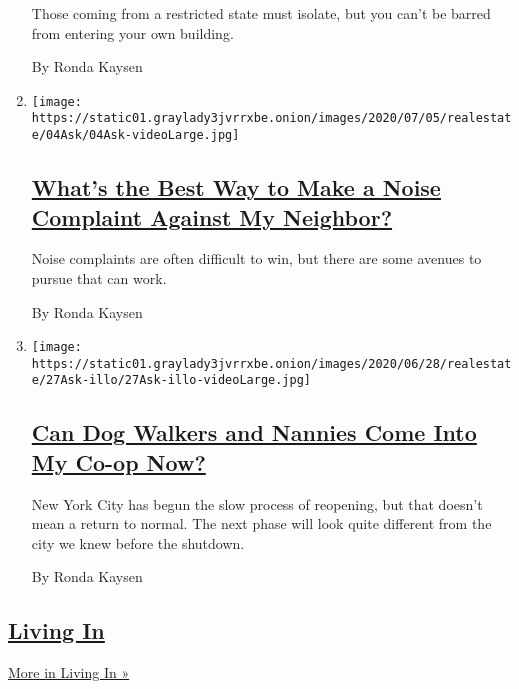 \begin{enumerate}
  Those coming from a restricted state must isolate, but you can't be
  barred from entering your own building.

  By Ronda Kaysen
\item
  \texttt{[image: https://static01.graylady3jvrrxbe.onion/images/2020/07/05/realestate/04Ask/04Ask-videoLarge.jpg]}

  \hypertarget{whats-the-best-way-to-make-a-noise-complaint-against-my-neighbor}{%
  \subsection{\texorpdfstring{\href{/2020/07/04/realestate/whats-the-best-way-to-make-a-noise-complaint-against-my-neighbor.html}{What's
  the Best Way to Make a Noise Complaint Against My
  Neighbor?}}{What's the Best Way to Make a Noise Complaint Against My Neighbor?}}\label{whats-the-best-way-to-make-a-noise-complaint-against-my-neighbor}}

  Noise complaints are often difficult to win, but there are some
  avenues to pursue that can work.

  By Ronda Kaysen
\item
  \texttt{[image: https://static01.graylady3jvrrxbe.onion/images/2020/06/28/realestate/27Ask-illo/27Ask-illo-videoLarge.jpg]}

  \hypertarget{can-dog-walkers-and-nannies-come-into-my-co-op-now}{%
  \subsection{\texorpdfstring{\href{/2020/06/29/realestate/coronavirus-phase-2-dog-walkers-nannies-co-op.html}{Can
  Dog Walkers and Nannies Come Into My Co-op
  Now?}}{Can Dog Walkers and Nannies Come Into My Co-op Now?}}\label{can-dog-walkers-and-nannies-come-into-my-co-op-now}}

  New York City has begun the slow process of reopening, but that
  doesn't mean a return to normal. The next phase will look quite
  different from the city we knew before the shutdown.

  By Ronda Kaysen
\end{enumerate}

\hypertarget{living-in}{%
\subsection{\texorpdfstring{\href{/column/living-in}{Living
In}}{Living In}}\label{living-in}}

\href{/column/living-in}{More in Living In »}

